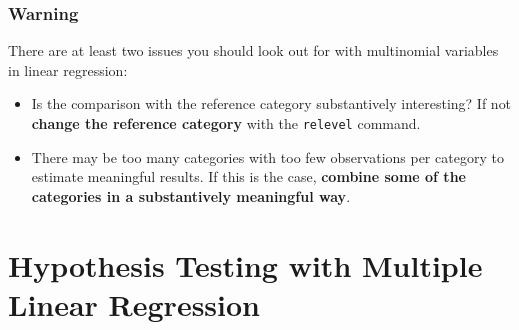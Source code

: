 \documentclass{beamer}\usepackage{graphicx, color}
\begin{document}
\begin{frame}[fragile]
  \frametitle{Warning}
  There are at least two issues you should look out for with multinomial variables in linear regression:
  \begin{itemize}
    \item Is the comparison with the reference category substantively interesting? If not \textbf{change the reference category} with the \texttt{relevel} command.
    \item There may be too many categories with too few observations per category to estimate meaningful results. If this is the case, \textbf{combine some of the categories in a substantively meaningful way}.
  \end{itemize}
\end{frame}

\section{Hypothesis Testing with Multiple Linear Regression}

\end{document}
